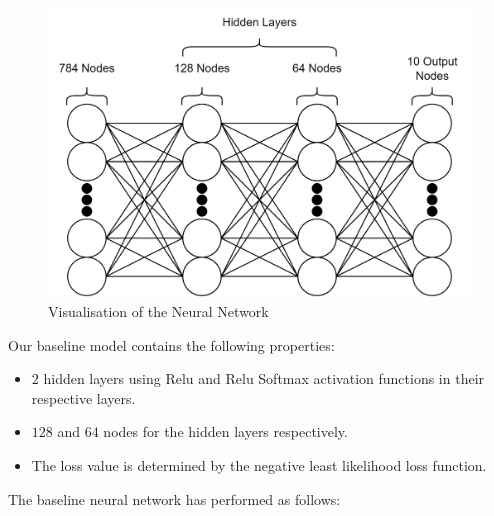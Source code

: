\documentclass[a4paper,twoside,10pt]{article}
\begin{document}
\begin{figure}[H]
	\centering
	\includegraphics[scale=0.5]{Baseline_NN}
	\caption{Visualisation of the Neural Network}
	\label{fig:baseline_nn}
\end{figure}

Our baseline model contains the following properties:
\begin{itemize}
    \item $2$ hidden layers using Relu and Relu Softmax activation functions in their respective layers.
    \item $128$ and $64$ nodes for the hidden layers respectively.
    \item The loss value is determined by the negative least likelihood loss function.
\end{itemize}

The baseline neural network has performed as follows:
\end{document}
